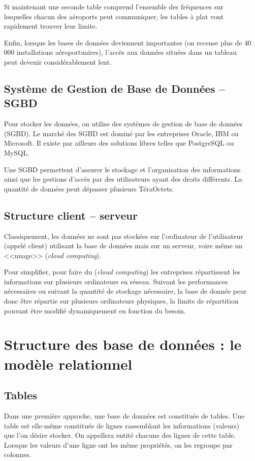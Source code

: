 \documentclass[10pt]{article}
\begin{document}
Si maintenant une seconde table comprend l'ensemble des fréquences sur lesquelles chacun des aéroports peut communiquer, les tables à plat vont rapidement trouver leur limite. 

Enfin, lorsque les bases de données deviennent importantes (on recense plus de 40 000 installations aéroportuaires), l'accès aux données situées dans un tableau peut devenir considérablement lent. 

\subsection{Système de Gestion de Base de Données -- SGBD}
Pour stocker les données, on utilise des systèmes de gestion de base de données (SGBD). Le marché des SGBD est dominé par les entreprises Oracle, IBM ou Microsoft. Il existe par ailleurs des solutions libres telles que PostgreSQL ou MySQL. 

Une SGBD permettent d'assurer le stockage et l'organisation des informations ainsi que les gestions d'accès par des utilisateurs ayant des droits différents. La quantité de données peut dépasser plusieurs TéraOctets.


\subsection{Structure client -- serveur}


Classiquement, les données ne sont pas stockées sur l'ordinateur de l'utilisateur (appelé client) utilisant la base de données mais sur un serveur, voire même un <<nuage>> (\textit{cloud computing}). 

Pour simplifier, pour faire du (\textit{cloud computing}) les entreprises répartissent les informations sur plusieurs ordinateurs en réseau. Suivant les performances nécessaires ou suivant la quantité de stockage nécessaire, la base de donnée peur donc être répartie sur plusieurs ordinateurs physiques, la limite de répartition pouvant être modifié dynamiquement en fonction du besoin. 

\section{Structure des base de données : le modèle relationnel}
\subsection{Tables}
Dans une première approche, une base de données est constituée de tables. Une table est elle-même constituée de lignes rassemblant les informations (valeurs) que l'on désire stocker. On appellera entité chacune des lignes de cette table. Lorsque les valeurs d'une ligne ont les même propriétés, on les regroupe par colonnes. 
\end{document}

